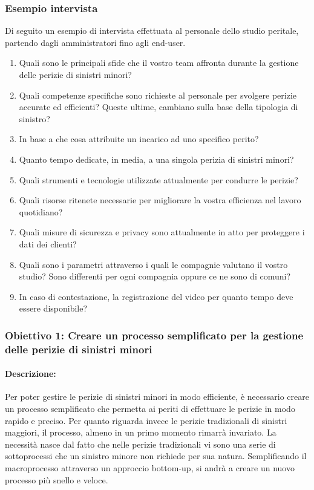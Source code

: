 \documentclass[a4paper,12pt, openright]{report}
\begin{document}
\subsubsection{Esempio intervista}
Di seguito un esempio di intervista effettuata al personale dello studio peritale, partendo dagli amministratori fino agli end-user.

\begin{enumerate}
    \item Quali sono le principali sfide che il vostro team affronta durante la gestione delle perizie di sinistri minori?
    \item Quali competenze specifiche sono richieste al personale per svolgere perizie accurate ed efficienti? Queste ultime, cambiano sulla base della tipologia di sinistro?
    \item In base a che cosa attribuite un incarico ad uno specifico perito? 
    \item Quanto tempo dedicate, in media, a una singola perizia di sinistri minori?
    \item Quali strumenti e tecnologie utilizzate attualmente per condurre le perizie?
    \item Quali risorse ritenete necessarie per migliorare la vostra efficienza nel lavoro quotidiano?
    \item Quali misure di sicurezza e privacy sono attualmente in atto per proteggere i dati dei clienti?
    \item Quali sono i parametri attraverso i quali le compagnie valutano il vostro studio? Sono differenti per ogni compagnia oppure ce ne sono di comuni? 
    \item In caso di contestazione, la registrazione del video per quanto tempo deve essere disponibile? 
\end{enumerate}

\subsubsection{Obiettivo 1: Creare un processo semplificato per la gestione delle perizie di sinistri minori}

\paragraph{Descrizione:}
Per poter gestire le perizie di sinistri minori in modo efficiente, è necessario creare un processo semplificato che permetta ai periti di effettuare le perizie in modo rapido e preciso. Per quanto riguarda invece le perizie tradizionali di sinistri maggiori, il processo, almeno in un primo momento rimarrà invariato.
La necessità nasce dal fatto che nelle perizie tradizionali vi sono una serie di sottoprocessi che un sinistro minore non richiede per sua natura. Semplificando il macroprocesso attraverso un approccio bottom-up, si andrà a creare un nuovo processo più snello e veloce.
\end{document}
